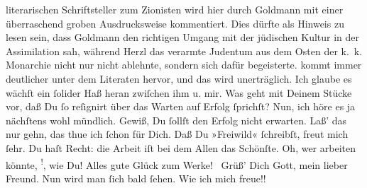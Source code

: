 \begin{ledgroupsized}[t]{13cm}
{{{                  literarischen Schriftsteller zum Zionisten wird hier durch Goldmann mit einer überraschend groben Ausdrucksweise
                  kommentiert. Dies dürfte als Hinweis zu lesen sein, dass Goldmann den richtigen Umgang mit der jüdischen Kultur in
                  der Assimilation sah, während Herzl das
                  verarmte Judentum aus dem Osten der k. k. Monarchie nicht nur nicht ablehnte,
                  sondern sich dafür begeisterte.}}}\label{K_L02742-4h} kommt immer deutlicher \strikeout{\textcolor{gray}{ut}} unter dem Literaten hervor, und das wird unerträglich. Ich glaube es wächſt
               ein  ſolider Haß heran zwiſchen ihm u. mir.\pend
           \pstart
           Was geht mit Deinem Stücke vor, daß Du ſo reſignirt über das {\pb}Warten auf Erfolg ſprichſt? Nun, ich höre es ja nächſtens wohl mündlich. Gewiß, Du
               ſollſt den Erfolg nicht erwarten. Laß’  das nur
               gehn, das thue ich ſchon für Dich.\pend
           \pstart
           Daß Du »Freiwild« ſchreibſt, freut mich ſehr. Du
               haſt Recht: die Arbeit iſt bei dem Allen das Schönſte. Oh, wer arbeiten könnte, \substVorne{}\textsuperscript{!}\substDazwischen{},\substHinten{} wie Du! Alles gute Glück {\pb}zum Werke! {\dotsfour}\pend
           \pstart
           Grüß’ Dich Gott, mein lieber Freund. Nun wird man ſich bald ſehen. Wie ich mich
                  freue!! {\dotstwo}\pend

\end{ledgroupsized}
